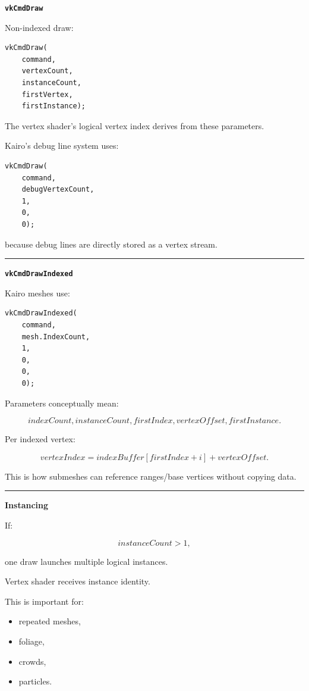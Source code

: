 \textbf{\texttt{vkCmdDraw}}

Non-indexed draw:

\begin{verbatim}
vkCmdDraw(
    command,
    vertexCount,
    instanceCount,
    firstVertex,
    firstInstance);
\end{verbatim}

The vertex shader's logical vertex index derives from these parameters.

Kairo's debug line system uses:

\begin{verbatim}
vkCmdDraw(
    command,
    debugVertexCount,
    1,
    0,
    0);
\end{verbatim}

because debug lines are directly stored as a vertex stream.

\begin{center}\rule{0.5\linewidth}{0.5pt}\end{center}

\textbf{\texttt{vkCmdDrawIndexed}}

Kairo meshes use:

\begin{verbatim}
vkCmdDrawIndexed(
    command,
    mesh.IndexCount,
    1,
    0,
    0,
    0);
\end{verbatim}

Parameters conceptually mean:

\[
indexCount,
instanceCount,
firstIndex,
vertexOffset,
firstInstance.
\]

Per indexed vertex:

\[
vertexIndex
=
indexBuffer[firstIndex+i]
+
vertexOffset.
\]

This is how submeshes can reference ranges/base vertices without copying data.

\begin{center}\rule{0.5\linewidth}{0.5pt}\end{center}

\textbf{Instancing}

If:

\[
instanceCount>1,
\]

one draw launches multiple logical instances.

Vertex shader receives instance identity.

This is important for:

\begin{itemize}
\tightlist
\item
  repeated meshes,
\item
  foliage,
\item
  crowds,
\item
  particles.
\end{itemize}

